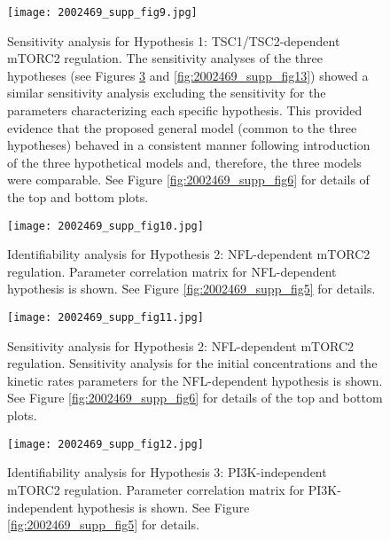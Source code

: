 \begin{figure}[tb]
	\begin{center}
		\texttt{[image: 2002469\_supp\_fig9.jpg]}
		\caption[Sensitivity analysis for Hypothesis 1: TSC1/TSC2-dependent mTORC2 regulation]{Sensitivity analysis for Hypothesis 1: TSC1/TSC2-dependent mTORC2 regulation. The sensitivity analyses of the three hypotheses (see Figures \ref{fig:2002469_supp_fig11} and \ref{fig:2002469_supp_fig13}) showed a similar sensitivity analysis excluding the sensitivity for the parameters characterizing each specific hypothesis. This provided evidence that the proposed general model (common to the three hypotheses) behaved in a consistent manner following introduction of the three hypothetical models and, therefore, the three models were comparable. See Figure \ref{fig:2002469_supp_fig6} for details of the top and bottom plots.}
		\label{fig:2002469_supp_fig9}
	\end{center}
\end{figure}
\clearpage

\begin{figure}[tb]
	\begin{center}
		\texttt{[image: 2002469\_supp\_fig10.jpg]}
		\caption[Identifiability analysis for Hypothesis 2: NFL-dependent mTORC2 regulation]{Identifiability analysis for Hypothesis 2: NFL-dependent mTORC2 regulation. Parameter correlation matrix for NFL-dependent hypothesis is shown. See Figure \ref{fig:2002469_supp_fig5} for details.}
		\label{fig:2002469_supp_fig10}
	\end{center}
\end{figure}
\clearpage

\begin{figure}[tb]
	\begin{center}
		\texttt{[image: 2002469\_supp\_fig11.jpg]}
		\caption[Sensitivity analysis for Hypothesis 2: NFL-dependent mTORC2 regulation]{Sensitivity analysis for Hypothesis 2: NFL-dependent mTORC2 regulation. Sensitivity analysis for the initial concentrations and the kinetic rates parameters for the NFL-dependent hypothesis is shown.  See Figure \ref{fig:2002469_supp_fig6} for details of the top and bottom plots.}
		\label{fig:2002469_supp_fig11}
	\end{center}
\end{figure}
\clearpage

\begin{figure}[tb]
	\begin{center}
		\texttt{[image: 2002469\_supp\_fig12.jpg]}
		\caption[Identifiability analysis for Hypothesis 3: PI3K-independent mTORC2 regulation]{Identifiability analysis for Hypothesis 3: PI3K-independent mTORC2 regulation. Parameter correlation matrix for PI3K-independent hypothesis is shown. See Figure \ref{fig:2002469_supp_fig5} for details.}
		\label{fig:2002469_supp_fig12}
	\end{center}
\end{figure}
\clearpage

